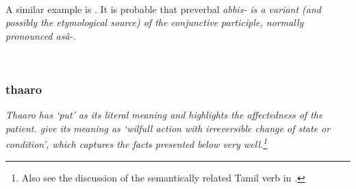  \\
A similar example is . It is probable that preverbal \em abbis- \em is a variant (and possibly the etymological source) of the conjunctive participle, normally pronounced \em asà-\em {}.


 \\


%

%


%
%



\subsubsection{thaaro}\label{sec:wc:thaaro}
\em Thaaro \em  has `put' as its literal meaning and highlights the affectedness of the patient. \citet[171]{SmithEtAl2007} give its meaning as `wilfull action with irreversible change of state or condition', which captures the facts presented below very well.\footnote{Also see the discussion of the semantically related Tamil verb  in \citet[89f]{Schiffman1999}.}

